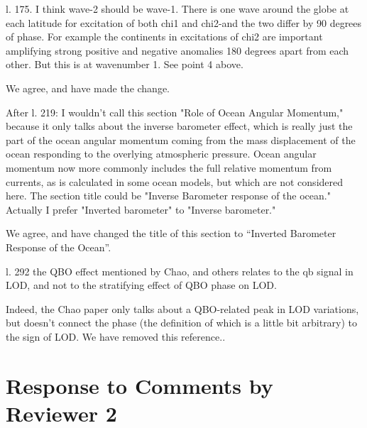 \documentclass[a4paper,10pt]{article}
\begin{document}
\noindent \textcolor{reviewer}{l. 175. I think wave-2 should be wave-1. There is one wave around the globe at each latitude for excitation of both chi1 and chi2-and the two differ by 90 degrees of phase. For example the continents in excitations of chi2 are important amplifying strong positive and negative anomalies 180 degrees apart from each other. But this is at wavenumber 1. See point 4 above.}
\vspace{0.5cm}

We agree, and have made the change.
\vspace{0.5cm}


\noindent \textcolor{reviewer}{After l. 219: I wouldn't call this section "Role of Ocean Angular Momentum," because it only talks about the inverse barometer effect, which is really just the part of the ocean angular momentum coming from the mass displacement of the ocean responding to the overlying atmospheric pressure. Ocean angular momentum now more commonly includes the full relative momentum from currents, as is calculated in some ocean models, but which are not considered here. The section title could be "Inverse Barometer response of the ocean." Actually I prefer "Inverted barometer" to "Inverse barometer."}
\vspace{0.5cm}

We agree, and have changed the title of this section to ``Inverted Barometer Response of the Ocean''.
\vspace{0.5cm}

\noindent \textcolor{reviewer}{l. 292 the QBO effect mentioned by Chao, and others relates to the qb signal in LOD, and not to the stratifying effect of QBO phase on LOD.}
\vspace{0.5cm}

Indeed, the Chao paper only talks about a QBO-related peak in LOD variations, but doesn't connect the phase (the definition of which is a little bit arbitrary) to the sign of LOD.  We have removed this reference..
\vspace{0.5cm}




\section{Response to Comments by Reviewer 2}
\end{document}
